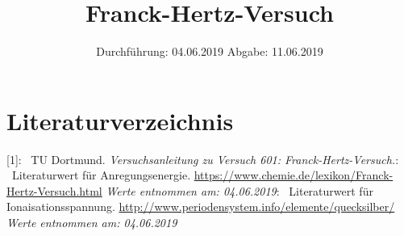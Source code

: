 

\subject{Nr.601}
\title{Franck-Hertz-Versuch}
\date{%
  Durchführung: 04.06.2019
  \hspace{3em}
  Abgabe: 11.06.2019
}



\maketitle
\thispagestyle{empty}
\tableofcontents
\newpage






\section{Literaturverzeichnis}

[1]: \ TU Dortmund. \textit{Versuchsanleitung zu Versuch 601:
Franck-Hertz-Versuch.}\newline
[2]: \ Literaturwert für Anregungsenergie. \url{https://www.chemie.de/lexikon/Franck-Hertz-Versuch.html} \newline
\textit{Werte entnommen am: 04.06.2019}\newline
[3]: \ Literaturwert für Ionaisationsspannung. \url{http://www.periodensystem.info/elemente/quecksilber/} \newline
\textit{Werte entnommen am: 04.06.2019}\newline

\printbibliography{}


